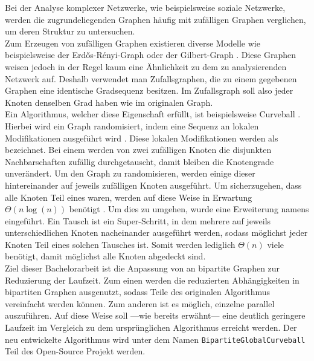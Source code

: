 Bei der Analyse komplexer Netzwerke, wie beispielsweise soziale Netzwerke, 
werden die zugrundeliegenden Graphen häufig mit zufälligen Graphen verglichen, 
um deren Struktur zu untersuchen\cite{DBLP:conf/esa/CarstensH0PTW18}.
\\

Zum Erzeugen von zufälligen Graphen existieren diverse Modelle wie 
beispielsweise der Erd\H{o}s-R\'enyi-Graph \cite{erdos}
oder der Gilbert-Graph \cite{gilbert}.
Diese Graphen
weisen jedoch in der Regel kaum eine Ähnlichkeit zu dem zu analysierenden Netzwerk auf.
Deshalb verwendet man Zufallsgraphen, die zu einem gegebenen Graphen eine identische Gradsequenz
besitzen. Im Zufallsgraph soll also jeder Knoten denselben Grad haben wie im originalen Graph.
\\

Ein Algorithmus, welcher diese Eigenschaft erfüllt, ist beispielsweise Curveball \cite{curveball}.
Hierbei wird ein Graph randomisiert, indem eine Sequenz an lokalen Modifikationen ausgeführt wird \cite{penschuck2020recent}.
Diese lokalen Modifikationen werden als \ct{} bezeichnet. Bei einem \ct{} werden von zwei zufälligen 
Knoten die disjunkten Nachbarschaften zufällig durchgetauscht, damit bleiben die Knotengrade unverändert.
Um den Graph zu randomisieren, werden einige dieser  hintereinander auf jeweils zufälligen Knoten ausgeführt.
Um sicherzugehen, dass alle Knoten Teil eines  waren, werden auf diese Weise
in Erwartung $\Theta(n\log(n))$   benötigt \cite{DBLP:conf/esa/CarstensH0PTW18}.
Um dies zu umgehen, wurde eine Erweiterung namens \gc{} \cite{DBLP:conf/esa/CarstensH0PTW18} eingeführt. 
Ein \gc{} Tausch ist ein \glqq Super-Schritt\grqq \cite{penschuck2020recent}, in dem mehrere  auf jeweils
unterschiedlichen Knoten nacheinander ausgeführt werden, sodass möglichst jeder Knoten Teil eines solchen Tausches ist. 
Somit werden lediglich $\Theta(n)$ viele  benötigt, %
damit möglichst alle Knoten abgedeckt sind.
\\

Ziel dieser Bachelorarbeit ist die Anpassung von \gc{} an bipartite Graphen zur 
Reduzierung der Laufzeit. 
Zum einen werden die reduzierten Abhängigkeiten in
 bipartiten Graphen ausgenutzt, sodass Teile des originalen \gc{} Algorithmus
vereinfacht werden können. Zum anderen ist es möglich, einzelne  parallel auszuführen.
Auf diese Weise soll ---wie bereits erwähnt--- eine deutlich geringere Laufzeit im Vergleich zu dem ursprünglichen \gc{}
Algorithmus erreicht werden.
Der neu entwickelte Algorithmus wird unter dem Namen \texttt{BipartiteGlobalCurveball} 
Teil des Open-Source Projekt \nk{} werden.
\\

